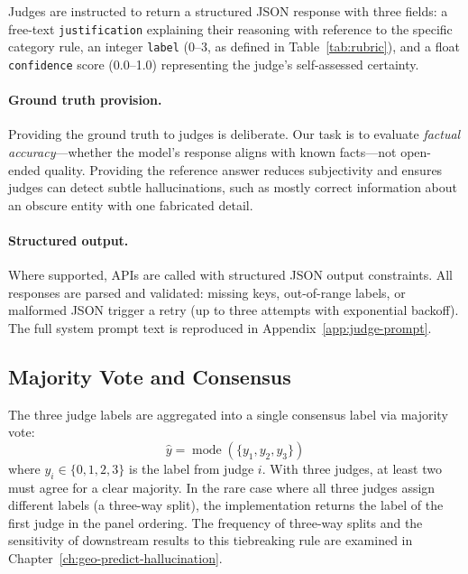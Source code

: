 Judges are instructed to return a structured JSON response with three fields: a free-text \texttt{justification} explaining their reasoning with reference to the specific category rule, an integer \texttt{label} (0--3, as defined in Table~\ref{tab:rubric}), and a float \texttt{confidence} score (0.0--1.0) representing the judge's self-assessed certainty.

\paragraph{Ground truth provision.} Providing the ground truth to judges is deliberate. Our task is to evaluate \emph{factual accuracy}---whether the model's response aligns with known facts---not open-ended quality. Providing the reference answer reduces subjectivity and ensures judges can detect subtle hallucinations, such as mostly correct information about an obscure entity with one fabricated detail.

\paragraph{Structured output.} Where supported, APIs are called with structured JSON output constraints. All responses are parsed and validated: missing keys, out-of-range labels, or malformed JSON trigger a retry (up to three attempts with exponential backoff). The full system prompt text is reproduced in Appendix~\ref{app:judge-prompt}.

\subsection{Majority Vote and Consensus}
\label{sec:majority-vote}

The three judge labels are aggregated into a single consensus label via majority vote:
%
\begin{equation}
\hat{y} = \operatorname{mode}(\{y_1, y_2, y_3\})
\label{eq:majority-vote}
\end{equation}
%
where $y_i \in \{0, 1, 2, 3\}$ is the label from judge $i$. With three judges, at least two must agree for a clear majority. In the rare case where all three judges assign different labels (a three-way split), the implementation returns the label of the first judge in the panel ordering. The frequency of three-way splits and the sensitivity of downstream results to this tiebreaking rule are examined in Chapter~\ref{ch:geo-predict-hallucination}.

